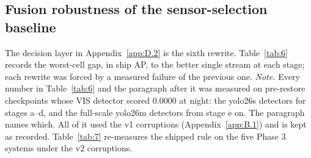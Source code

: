 \documentclass[10pt]{article}
\begin{document}
\subsection{Fusion robustness of the sensor-selection baseline}\label{app:D.3}
The decision layer in Appendix~\ref{app:D.2} is the sixth rewrite. Table~\ref{tab:6} records the worst-cell gap, in ship AP, to the better single stream at each stage; each rewrite was forced by a measured failure of the previous one. \emph{Note.} Every number in Table~\ref{tab:6} and the paragraph after it was measured on pre-restore checkpoints whose VIS detector scored 0.0000 at night: the yolo26s detectors for stages a--d, and the full-scale yolo26m detectors from stage e on. The paragraph names which. All of it used the v1 corruptions (Appendix~\ref{app:B.1}) and is kept as recorded. Table~\ref{tab:7} re-measures the shipped rule on the five Phase 3 systems under the v2 corruptions.
\end{document}
